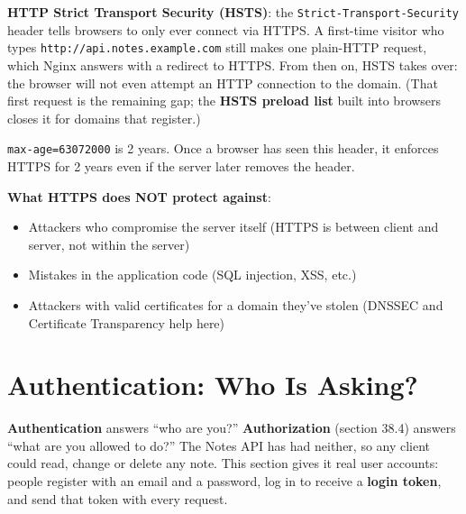 \textbf{HTTP Strict Transport Security (HSTS)}: the \texttt{Strict-}\allowbreak{}\texttt{Transport-}\allowbreak{}\texttt{Security} header tells browsers to only ever connect via HTTPS. A first-time visitor who types \texttt{http:}\allowbreak{}\texttt{/}\allowbreak{}\texttt{/}\allowbreak{}\texttt{api.}\allowbreak{}\texttt{notes.}\allowbreak{}\texttt{example.}\allowbreak{}\texttt{com} still makes one plain-HTTP request, which Nginx answers with a redirect to HTTPS. From then on, HSTS takes over: the browser will not even attempt an HTTP connection to the domain. (That first request is the remaining gap; the \textbf{HSTS preload list} built into browsers closes it for domains that register.)

\begin{codebox}[short]

\begin{Shaded}
\begin{Highlighting}[]
\end{Highlighting}
\end{Shaded}

\end{codebox}

\noindent{}\texttt{max-age=63072000} is 2 years. Once a browser has seen this header, it enforces HTTPS for 2 years even if the server later removes the header.

\textbf{What HTTPS does NOT protect against}:

\begin{itemize}
\tightlist
\item
  Attackers who compromise the server itself (HTTPS is between client and server, not within the server)
\item
  Mistakes in the application code (SQL injection, XSS, etc.)
\item
  Attackers with valid certificates for a domain they've stolen (DNSSEC and Certificate Transparency help here)
\end{itemize}

\setcounter{section}{2}
\section{Authentication: Who Is Asking?}\label{38-security:383-authentication-who-is-asking}

\textbf{Authentication} answers ``who are you?'' \textbf{Authorization} (section 38.4) answers ``what are you allowed to do?'' The Notes API has had neither, so any client could read, change or delete any note. This section gives it real user accounts: people register with an email and a password, log in to receive a \textbf{login token}, and send that token with every request.

